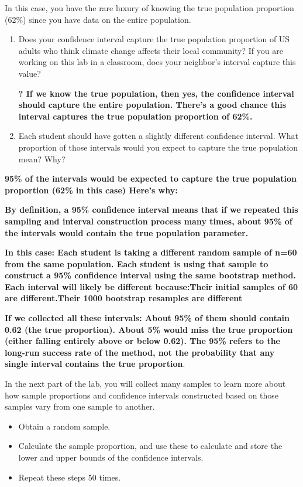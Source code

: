 \documentclass[
]{article}
\providecommand{\tightlist}{%
  \setlength{\itemsep}{0pt}\setlength{\parskip}{0pt}}
\begin{document}
In this case, you have the rare luxury of knowing the true population
proportion (62\%) since you have data on the entire population.

\begin{enumerate}
\def\labelenumi{\arabic{enumi}.}
\item
  Does your confidence interval capture the true population proportion
  of US adults who think climate change affects their local community?
  If you are working on this lab in a classroom, does your neighbor's
  interval capture this value?

  \textbf{? If we know the true population, then yes, the confidence
  interval should capture the entire population. There's a good chance
  this interval captures the true population proportion of 62\%.}
\item
  Each student should have gotten a slightly different confidence
  interval. What proportion of those intervals would you expect to
  capture the true population mean? Why?
\end{enumerate}

\textbf{95\% of the intervals would be expected to capture the true
population proportion (62\% in this case) Here's why:}

\textbf{By definition, a 95\% confidence interval means that if we
repeated this sampling and interval construction process many times,
about 95\% of the intervals would contain the true population
parameter.}

\textbf{In this case: Each student is taking a different random sample
of n=60 from the same population. Each student is using that sample to
construct a 95\% confidence interval using the same bootstrap method.
Each interval will likely be different because:Their initial samples of
60 are different.Their 1000 bootstrap resamples are different}

\textbf{If we collected all these intervals: About 95\% of them should
contain 0.62 (the true proportion). About 5\% would miss the true
proportion (either falling entirely above or below 0.62). The 95\%
refers to the long-run success rate of the method, not the probability
that any single interval contains the true proportion}.

In the next part of the lab, you will collect many samples to learn more
about how sample proportions and confidence intervals constructed based
on those samples vary from one sample to another.

\begin{itemize}
\tightlist
\item
  Obtain a random sample.
\item
  Calculate the sample proportion, and use these to calculate and store
  the lower and upper bounds of the confidence intervals.
\item
  Repeat these steps 50 times.
\end{itemize}
\end{document}
